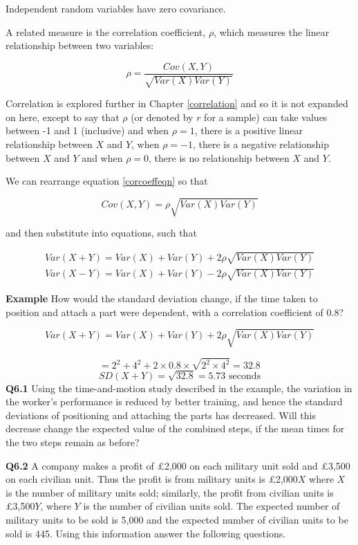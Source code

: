 \documentclass[
  oneside]{krantz}
\begin{document}
Independent random variables have zero covariance.

A related measure is the correlation coefficient, \(\rho\), which measures the linear relationship between two variables:

\begin{equation}
\label{corcoeffeqn}
\rho = \frac{Cov(X,Y)}{\sqrt{Var(X)Var(Y)}}
\end{equation}

Correlation is explored further in Chapter \ref{correlation} and so it is not expanded on here, except to say that \(\rho\) (or denoted by \(r\) for a sample) can take values between -1 and 1 (inclusive) and when \(\rho=1\), there is a positive linear relationship between \(X\) and \(Y\), when \(\rho=-1\), there is a negative relationship between \(X\) and \(Y\) and when \(\rho=0\), there is no relationship between \(X\) and \(Y\).

We can rearrange equation \ref{corcoeffeqn} so that

\[Cov(X,Y) = \rho \sqrt{Var(X)Var(Y)}\]

and then substitute into equations, such that

\begin{align}
Var(X+Y) = Var(X) + Var(Y) + 2\rho \sqrt{Var(X)Var(Y)} \\
Var(X-Y) = Var(X) + Var(Y) - 2\rho \sqrt{Var(X)Var(Y)}
\end{align}

\textbf{Example} How would the standard deviation change, if the time taken to position and attach a part were dependent, with a correlation coefficient of 0.8?

\[Var(X+Y) = Var(X) + Var(Y) + 2\rho\sqrt{Var(X)Var(Y)}\]

\[ =2^2 + 4^2 + 2 \times 0.8 \times \sqrt{2^2 \times 4^2} = 32.8\]
\[SD(X+Y) = \sqrt{32.8} = 5.73 \textrm{ seconds}\]
\textbf{Q6.1} Using the time-and-motion study described in the example, the variation in the worker's performance is reduced by better training, and hence the standard deviations of positioning and attaching the parts has decreased. Will this decrease change the expected value of the combined steps, if the mean times for the two steps remain as before?

\textbf{Q6.2} A company makes a profit of \pounds 2,000 on each military unit sold and \pounds 3,500 on each civilian unit. Thus the profit is from military units is \pounds 2,000\(X\) where \(X\) is the number of military units sold; similarly, the profit from civilian units is \pounds 3,500\(Y\), where \(Y\) is the number of civilian units sold. The expected number of military units to be sold is 5,000 and the expected number of civilian units to be sold is 445. Using this information answer the following questions.
\end{document}
